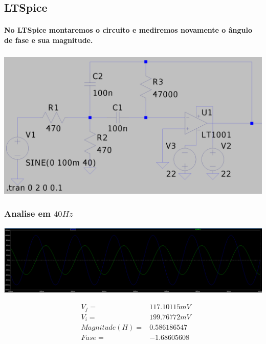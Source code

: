 \documentclass[12pt,twoside, a4paper, twocolumn]{article}
\begin{document}
\newpage


\subsection{LTSpice}


\paragraph*{No LTSpice montaremos o circuito e mediremos novamente o ângulo de fase e sua magnitude.}
\subparagraph*{}
\begin{adjustbox}{scale=0.09}
    \includegraphics{ltspicecirc.png}
\end{adjustbox}


\subsubsection{Analise em $40Hz$}


\begin{adjustbox}{scale=0.09}
    \includegraphics{ltfreq40.png}
\end{adjustbox}


\begin{equation*}
    \begin{aligned}
         & V_f =          & 117.10115mV \\
         & V_i =          & 199.76772mV \\
         & Magnitude(H) = & 0.586186547 \\
         & Fase =         & -1.68605608
    \end{aligned}
\end{equation*}
\end{document}
